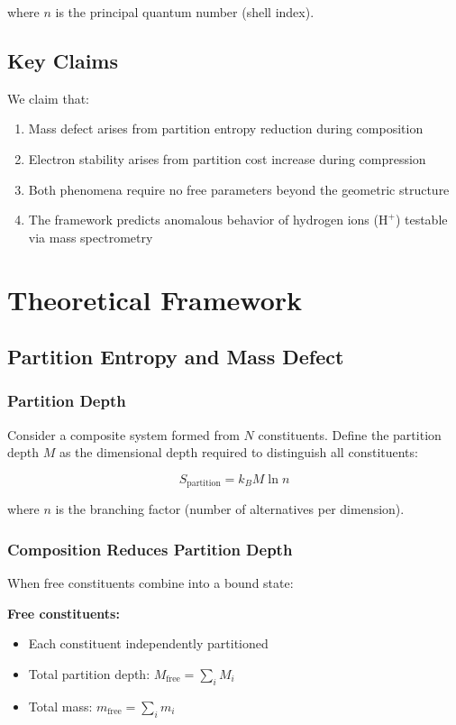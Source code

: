 \documentclass[12pt,a4paper]{article}
\begin{document}
where $n$ is the principal quantum number (shell index).

\subsection{Key Claims}

We claim that:
\begin{enumerate}
\item Mass defect arises from partition entropy reduction during composition
\item Electron stability arises from partition cost increase during compression
\item Both phenomena require no free parameters beyond the geometric structure
\item The framework predicts anomalous behavior of hydrogen ions ($\text{H}^+$) testable via mass spectrometry
\end{enumerate}

\section{Theoretical Framework}

\subsection{Partition Entropy and Mass Defect}

\subsubsection{Partition Depth}

Consider a composite system formed from $N$ constituents. Define the partition depth $M$ as the dimensional depth required to distinguish all constituents:

$$
S_{\text{partition}} = k_B M \ln n
$$

where $n$ is the branching factor (number of alternatives per dimension).

\subsubsection{Composition Reduces Partition Depth}

When free constituents combine into a bound state:

\textbf{Free constituents:}
\begin{itemize}
\item Each constituent independently partitioned
\item Total partition depth: $M_{\text{free}} = \sum_i M_i$
\item Total mass: $m_{\text{free}} = \sum_i m_i$
\end{itemize}
\end{document}
